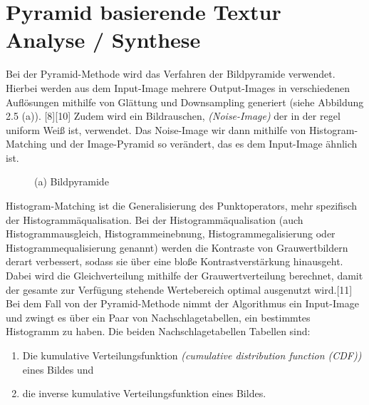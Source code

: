 \documentclass[12pt, a4paper,twoside,openright]{report}
\begin{document}
\section{Pyramid basierende Textur Analyse / Synthese}

Bei der Pyramid-Methode wird das Verfahren der Bildpyramide verwendet.
Hierbei werden aus dem Input-Image mehrere Output-Images in verschiedenen Auflösungen mithilfe von Glättung und Downsampling generiert {(siehe Abbildung 2.5 (a))}. {[8][10]}
\newline
Zudem wird ein Bildrauschen, \textit{(Noise-Image)} der in der regel uniform Weiß ist, verwendet.
Das Noise-Image wir dann mithilfe von Histogram-Matching und der Image-Pyramid so verändert, das es dem Input-Image ähnlich ist.

\begin{figure}[H]
    \centering
    \caption{(a) Bildpyramide}%
\end{figure}

Histogram-Matching ist die Generalisierung des Punktoperators, mehr spezifisch der Histogrammäqualisation.
Bei der Histogrammäqualisation {(auch Histogrammausgleich, Histogrammeinebnung, Histogrammegalisierung oder Histogrammequalisierung genannt)}
werden die Kontraste von Grauwertbildern derart verbessert, sodass sie über eine bloße Kontrastverstärkung hinausgeht.
Dabei wird die Gleichverteilung mithilfe der Grauwertverteilung berechnet, damit der gesamte zur Verfügung stehende Wertebereich optimal ausgenutzt wird.{[11]}
Bei dem Fall von der Pyramid-Methode nimmt der Algorithmus ein Input-Image und zwingt es über ein Paar von Nachschlagetabellen, ein bestimmtes Histogramm zu haben.
Die beiden Nachschlagetabellen Tabellen sind:

\begin{enumerate}
    \item Die kumulative Verteilungsfunktion \textit{(cumulative distribution function (CDF))} eines Bildes und
    \item die inverse kumulative Verteilungsfunktion eines Bildes.
  \end{enumerate}
\end{document}
